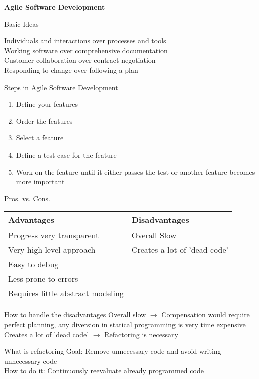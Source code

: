 \documentclass[10pt,a4paper]{beamer}
\begin{document}
	\begin{frame}
		\begin{center}
			\begin{LARGE}
				\textbf{Agile Software Development}
			\end{LARGE}
		\end{center}
	\end{frame}
	
	\begin{frame}{Basic Ideas}
		\begin{center}
			Individuals and interactions over processes and tools \\
			Working software over comprehensive documentation \\
			Customer collaboration over contract negotiation \\
			Responding to change over following a plan
		\end{center}
	\end{frame}

	\begin{frame}{Steps in Agile Software Development}
		\begin{enumerate}
			\item Define your features
			\item Order the features
			\item Select a feature
			\item Define a test case for the feature
			\item Work on the feature until it either passes the test or another feature becomes more important
		\end{enumerate}
	\end{frame}

	\begin{frame}{Pros. vs. Cons.}
		\begin{center}
			\begin{tabular}{l|l}
				Advantages	&	Disadvantages \\ \hline
				Progress very transparent	&	Overall Slow \\
				Very high level approach	&	Creates a lot of 'dead code' \\
				Easy to debug	\\
				Less prone to errors	\\
				Requires little abstract modeling
			\end{tabular}
		\end{center}
	\end{frame}

	\begin{frame}{How to handle the disadvantages}
		Overall slow $\rightarrow$ Compensation would require perfect planning, any diversion in statical programming is very time expensive \\ \vspace*{.5cm}
		Creates a lot of 'dead code' $\rightarrow$ Refactoring is necessary
	\end{frame}

	\begin{frame}{What is refactoring}
		Goal: Remove unnecessary code and avoid writing unnecessary code \\
		\vspace*{.5cm}
		How to do it: Continuously reevaluate already programmed code
	\end{frame}
\end{document}
